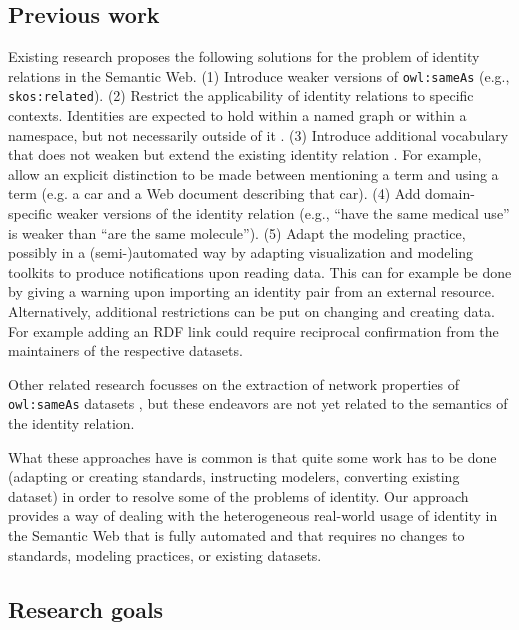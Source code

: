 \documentclass[letterpaper]{article}
\begin{document}
\subsection{Previous work}
\label{sec:previous_work}

Existing research proposes the following solutions for the problem of identity relations in the Semantic Web. (1) Introduce weaker versions of \verb|owl:sameAs| \cite{halpin_hayes_2010,mccusker_mcguinness_2010} (e.g., \verb|skos:related|). (2) Restrict the applicability of identity relations to specific contexts. Identities are expected to hold within a named graph or within a namespace, but not necessarily outside of it \cite{halpin_hayes_2010,melo_2013}. (3) Introduce additional vocabulary that does not weaken but extend the existing identity relation \cite{halpin_hayes_2010}. For example, allow an explicit distinction to be made between mentioning a term and using a term (e.g. a car and a Web document describing that car). (4) Add domain-specific weaker versions of the identity relation \cite{mccusker_mcguinness_2010} (e.g., ``have the same medical use'' is weaker than ``are the same molecule''). (5) Adapt the modeling practice, possibly in a (semi-)automated way by adapting visualization and modeling toolkits to produce notifications upon reading data. This can for example be done by giving a warning upon importing an identity pair from an external resource. Alternatively, additional restrictions can be put on changing and creating data. For example adding an RDF link could require reciprocal confirmation from the maintainers of the respective datasets. \cite{halpin_hayes_2010,ding_shinavier_finin_mcguinness_2010}

Other related research focusses on the extraction of network properties of \verb|owl:sameAs| datasets \cite{ding_shinavier_shangguan_mcguinness_2010}, but these endeavors are not yet related to the semantics of the identity relation.

What these approaches have is common is that quite some work has to be done (adapting or creating standards, instructing modelers, converting existing dataset) in order to resolve some of the problems of identity. Our approach provides a way of dealing with the heterogeneous real-world usage of identity in the Semantic Web that is fully automated and that requires no changes to standards, modeling practices, or existing datasets.

\subsection{Research goals}
\label{sec:research_goals}
\end{document}
